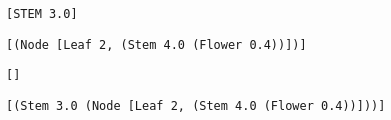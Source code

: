 \documentclass[
	aspectratio=169, 
	10pt 
]{beamer}
\begin{document}
\begin{frame}[c, fragile]{\insertsubsection}
    \begin{fancycolumns}[widths={30,70}]
        \centering
        \begin{lstlisting}[gobble=8]    
            [STEM 3.0]   
        \end{lstlisting}
        \nextcolumn    
        \centering
        \begin{lstlisting}[gobble=8]     
            [(Node [Leaf 2, (Stem 4.0 (Flower 0.4))])]
        \end{lstlisting}
    \end{fancycolumns}
\end{frame}


\begin{frame}[c, fragile]{\insertsubsection}
    \begin{fancycolumns}[widths={10,90}]
        \centering
        \begin{lstlisting}[gobble=8]    
            []   
        \end{lstlisting}
        \nextcolumn    
        \centering
        \begin{lstlisting}[gobble=8]     
            [(Stem 3.0 (Node [Leaf 2, (Stem 4.0 (Flower 0.4))]))]
        \end{lstlisting}
    \end{fancycolumns}
\end{frame}
\end{document}
